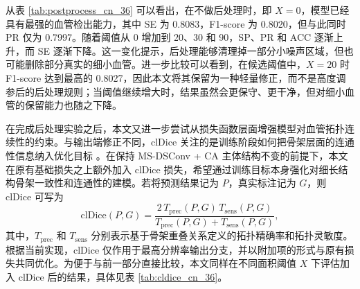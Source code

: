 \documentclass[a4paper,12pt]{article}
\begin{document}
\begin{table}[htbp]
\centering
\caption{MS-DSConv + CA 在不同后处理阈值下的结果对比}
\label{tab:postprocess_cn_36}
\end{table}

从表 \ref{tab:postprocess_cn_36} 可以看出，在不做后处理时，即 \(X=0\)，模型已经具有最强的血管检出能力，其中 SE 为 0.8083，F1-score 为 0.8020，但与此同时 PR 仅为 0.7997。随着阈值从 0 增加到 20、30 和 90，SP、PR 和 ACC 逐渐上升，而 SE 逐渐下降。这一变化提示，后处理能够清理掉一部分小噪声区域，但也可能删除部分真实的细小血管。进一步比较可以看到，在候选阈值中，\(X=20\) 时 F1-score 达到最高的 0.8027，因此本文将其保留为一种轻量修正，而不是高度调参后的后处理规则；当阈值继续增大时，结果虽然会更保守、更干净，但对细小血管的保留能力也随之下降。

在完成后处理实验之后，本文又进一步尝试从损失函数层面增强模型对血管拓扑连续性的约束。与输出端修正不同，clDice 关注的是训练阶段如何把骨架层面的连通性信息纳入优化目标 \cite{qi2023dsc}。在保持 MS-DSConv + CA 主体结构不变的前提下，本文在原有基础损失之上额外加入 clDice 损失，希望通过训练目标本身强化对细长结构骨架一致性和连通性的建模。若将预测结果记为 \(P\)，真实标注记为 \(G\)，则 clDice 可写为
\[
\mathrm{clDice}(P,G)=
\frac{2\,T_{\mathrm{prec}}(P,G)\,T_{\mathrm{sens}}(P,G)}
{T_{\mathrm{prec}}(P,G)+T_{\mathrm{sens}}(P,G)},
\]
其中，\(T_{\mathrm{prec}}\) 和 \(T_{\mathrm{sens}}\) 分别表示基于骨架重叠关系定义的拓扑精确率和拓扑灵敏度。根据当前实现，clDice 仅作用于最高分辨率输出分支，并以附加项的形式与原有损失共同优化。为便于与前一部分直接比较，本文同样在不同面积阈值 \(X\) 下评估加入 clDice 后的结果，具体见表 \ref{tab:cldice_cn_36}。
\end{document}
